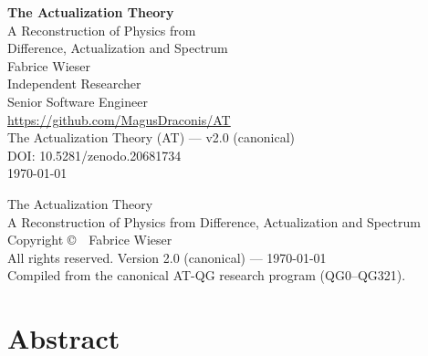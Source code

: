 
\thispagestyle{empty}
\begin{center}
  \vspace*{2.5cm}
  {\Huge\bfseries The Actualization Theory}\\[1em]
  {\LARGE A Reconstruction of Physics from\\ Difference, Actualization and Spectrum}\\[2.5cm]
  {\Large Fabrice Wieser}\\[1mm]
  {\small Independent Researcher}\\[0.5mm]
  {\small Senior Software Engineer}\\[0.5mm]
  {\small \url{https://github.com/MagusDraconis/AT}}\\[2.5cm]
  {\large The Actualization Theory (AT) --- v2.0 (canonical)}\\[0.5cm]
  {\large DOI: 10.5281/zenodo.20681734}\\[0.5cm]
  {\large \today}\\[1.5cm]
  \vfill
\end{center}
\clearpage

\thispagestyle{empty}
\begin{center}
  \vspace*{4cm}
  {\large The Actualization Theory}\\[0.6em]
  {\normalsize A Reconstruction of Physics from Difference, Actualization and Spectrum}\\[2em]
  {\normalsize Copyright \copyright\ \the\year\ Fabrice Wieser}\\[1.5em]
  {\small All rights reserved.}
  \vfill
  {\small Version 2.0 (canonical) --- \today}\\
  {\small Compiled from the canonical AT-QG research program (QG0--QG321).}
  \vfill
\end{center}
\clearpage

\chapter*{Abstract}
\label{fm:abs:abstract}

